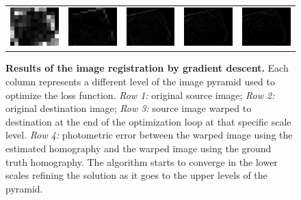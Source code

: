 \begin{figure}[h]
\begin{center}
\begin{tabular}{c c c c c}
        \includegraphics[width=2.2cm]{main/chapter03/data/homography/error_1.jpg} &
        \includegraphics[width=2.2cm]{main/chapter03/data/homography/error_2.jpg} &
        \includegraphics[width=2.2cm]{main/chapter03/data/homography/error_3.jpg} &
        \includegraphics[width=2.2cm]{main/chapter03/data/homography/error_4.jpg} &
        \includegraphics[width=2.2cm]{main/chapter03/data/homography/error_5.jpg} \\
        \end{tabular}
    \end{center}
    \caption[Results of the image registration by gradient descent]{{\bf Results of the image registration by gradient descent.} Each  column represents a different level of the image pyramid used to optimize the loss function. \textit{Row 1:}  original source image; \textit{Row 2:}  original destination image; \textit{Row 3:}  source image warped to destination at the end of the optimization loop at that specific scale level.\textit{ Row 4:}  photometric error between the warped image using the estimated homography and the warped image using the ground truth homography. The algorithm starts to converge in the lower scales refining the solution as it goes to the upper levels of the pyramid.}
    \label{fig:homography_pyramid}
\end{figure}

\label{section:use_cases:depth_estimation}
